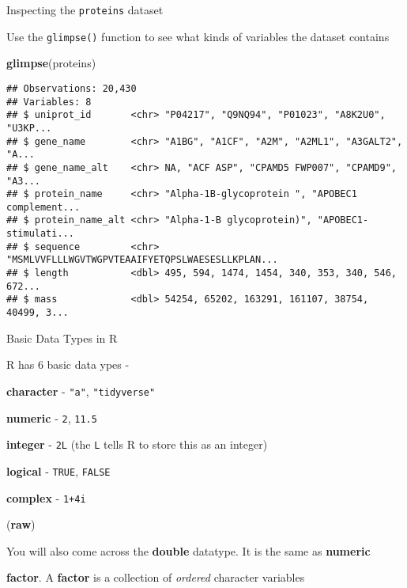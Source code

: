 \documentclass[ignorenonframetext,]{beamer}
\newenvironment{Shaded}{\begin{snugshade}}{\end{snugshade}}
\newcommand{\KeywordTok}[1]{\textcolor[rgb]{0.13,0.29,0.53}{\textbf{#1}}}
\newcommand{\NormalTok}[1]{#1}
\begin{document}
\begin{frame}[fragile]{Inspecting the \texttt{proteins} dataset}
\protect\hypertarget{inspecting-the-proteins-dataset-1}{}

Use the \texttt{glimpse()} function to see what kinds of variables the
dataset contains

\begin{Shaded}
\begin{Highlighting}[]
\KeywordTok{glimpse}\NormalTok{(proteins)}
\end{Highlighting}
\end{Shaded}

\begin{verbatim}
## Observations: 20,430
## Variables: 8
## $ uniprot_id       <chr> "P04217", "Q9NQ94", "P01023", "A8K2U0", "U3KP...
## $ gene_name        <chr> "A1BG", "A1CF", "A2M", "A2ML1", "A3GALT2", "A...
## $ gene_name_alt    <chr> NA, "ACF ASP", "CPAMD5 FWP007", "CPAMD9", "A3...
## $ protein_name     <chr> "Alpha-1B-glycoprotein ", "APOBEC1 complement...
## $ protein_name_alt <chr> "Alpha-1-B glycoprotein)", "APOBEC1-stimulati...
## $ sequence         <chr> "MSMLVVFLLLWGVTWGPVTEAAIFYETQPSLWAESESLLKPLAN...
## $ length           <dbl> 495, 594, 1474, 1454, 340, 353, 340, 546, 672...
## $ mass             <dbl> 54254, 65202, 163291, 161107, 38754, 40499, 3...
\end{verbatim}

\end{frame}

\begin{frame}[fragile]{Basic Data Types in R}
\protect\hypertarget{basic-data-types-in-r}{}

R has 6 basic data ypes -

\textbf{character} - \texttt{"a"}, \texttt{"tidyverse"}

\textbf{numeric} - \texttt{2}, \texttt{11.5}

\textbf{integer} - \texttt{2L} (the \texttt{L} tells R to store this as
an integer)

\textbf{logical} - \texttt{TRUE}, \texttt{FALSE}

\textbf{complex} - \texttt{1+4i}

(\textbf{raw})

You will also come across the \textbf{double} datatype. It is the same
as \textbf{numeric}

\textbf{factor}. A \textbf{factor} is a collection of \emph{ordered}
character variables

\end{frame}
\end{document}
